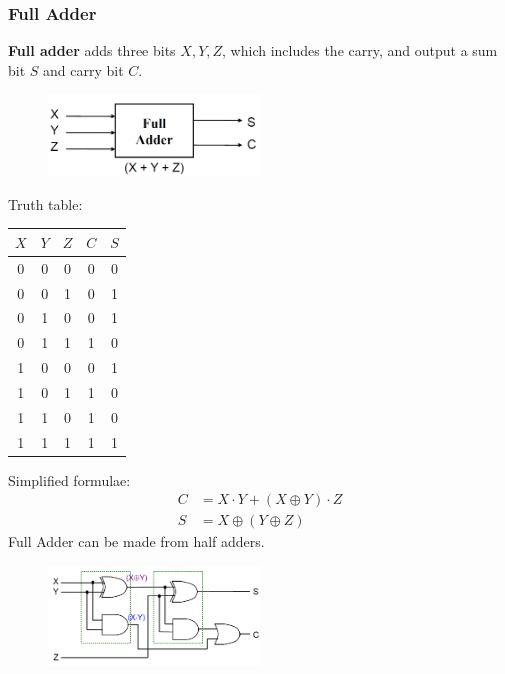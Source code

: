 \documentclass[12pt]{article}
\theoremstyle{definition}
\begin{document}
\subsubsection{Full Adder}
\textbf{Full adder} adds three bits $X,Y,Z$, which includes the carry, and output a sum bit $S$ and carry bit $C$.
\begin{figure}[h]
\centering
\includegraphics[width = 0.5\textwidth]{6_1.png}
\end{figure}
Truth table:
\begin{table}[h]
\centering
\begin{tabular}{|c|c|c||c|c|}
\hline
$X$&$Y$&$Z$&$C$&$S$\\\hline
0&0&0&0&0\\\hline
0&0&1&0&1\\\hline
0&1&0&0&1\\\hline
0&1&1&1&0\\\hline
1&0&0&0&1\\\hline
1&0&1&1&0\\\hline
1&1&0&1&0\\\hline
1&1&1&1&1\\\hline
\end{tabular}
\end{table}
Simplified formulae:
\begin{align*}
C&=X\cdot Y + (X\oplus Y)\cdot Z\\
S&=X\oplus(Y\oplus Z)
\end{align*}
Full Adder can be made from half adders.
\clearpage
\begin{figure}[ht]
\centering
\includegraphics[width = 0.5\textwidth]{6_2.png}
\end{figure}
\end{document}
